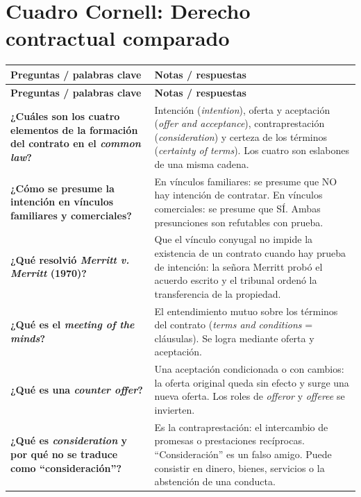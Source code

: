 \documentclass[12pt,oneside]{book}
\begin{document}
\chapter*{Cuadro Cornell: Derecho contractual comparado}

\begin{longtable}{
    >{\raggedright\arraybackslash}p{}
    >{\raggedright\arraybackslash}p{}
}
\toprule
\textbf{Preguntas / palabras clave} & \textbf{Notas / respuestas} \\
\midrule
\endfirsthead
\toprule
\textbf{Preguntas / palabras clave} & \textbf{Notas / respuestas} \\
\midrule
\endhead
\textbf{¿Cuáles son los cuatro elementos de la formación del contrato en el \textit{common law}?} &
Intención (\textit{intention}), oferta y aceptación (\textit{offer and acceptance}), contraprestación (\textit{consideration}) y certeza de los términos (\textit{certainty of terms}). Los cuatro son eslabones de una misma cadena. \\

\textbf{¿Cómo se presume la intención en vínculos familiares y comerciales?} &
En vínculos familiares: se presume que NO hay intención de contratar. En vínculos comerciales: se presume que SÍ. Ambas presunciones son refutables con prueba. \\

\textbf{¿Qué resolvió \textit{Merritt v. Merritt} (1970)?} &
Que el vínculo conyugal no impide la existencia de un contrato cuando hay prueba de intención: la señora Merritt probó el acuerdo escrito y el tribunal ordenó la transferencia de la propiedad. \\

\textbf{¿Qué es el \textit{meeting of the minds}?} &
El entendimiento mutuo sobre los términos del contrato (\textit{terms and conditions} = cláusulas). Se logra mediante oferta y aceptación. \\

\textbf{¿Qué es una \textit{counter offer}?} &
Una aceptación condicionada o con cambios: la oferta original queda sin efecto y surge una nueva oferta. Los roles de \textit{offeror} y \textit{offeree} se invierten. \\

\textbf{¿Qué es \textit{consideration} y por qué no se traduce como ``consideración''?} &
Es la contraprestación: el intercambio de promesas o prestaciones recíprocas. ``Consideración'' es un falso amigo. Puede consistir en dinero, bienes, servicios o la abstención de una conducta. \\


\end{longtable}
\end{document}
